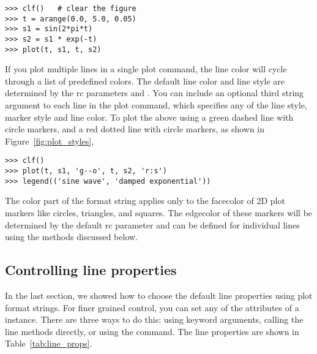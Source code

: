 \documentclass[twoside]{book}
\begin{document}
\begin{lstlisting}
>>> clf()   # clear the figure
>>> t = arange(0.0, 5.0, 0.05)
>>> s1 = sin(2*pi*t)
>>> s2 = s1 * exp(-t)
>>> plot(t, s1, t, s2)
\end{lstlisting}

\noindent If you plot multiple lines in a single plot command, the
line color will cycle through a list of predefined colors.  The
default line color and line style are determined by the rc parameters
 and .  You can include an optional
third string argument to each line in the plot command, which
specifies any of the line style, marker style and line color.  To plot
the above using a green dashed line with circle markers, and a red
dotted line with circle markers, as shown in
Figure~\ref{fig:plot_styles}, 

\begin{lstlisting}
>>> clf()   
>>> plot(t, s1, 'g--o', t, s2, 'r:s')
>>> legend(('sine wave', 'damped exponential'))
\end{lstlisting}


\noindent The color part of the format string applies only to the
facecolor of 2D plot markers like circles, triangles, and squares.
The edgecolor of these markers will be determined by the default rc
parameter  and can be defined for individual
lines using the methods discussed below.

\subsection{Controlling line properties}
\label{sec:plot_line_props}

In the last section, we showed how to choose the default line
properties using plot format strings.  For finer grained control, you
can set any of the attributes of a 
instance.  There are three ways to do this: using keyword arguments,
calling the line methods directly, or using the  command.
The line properties are shown in Table~\ref{tab:line_props}.
\end{document}
